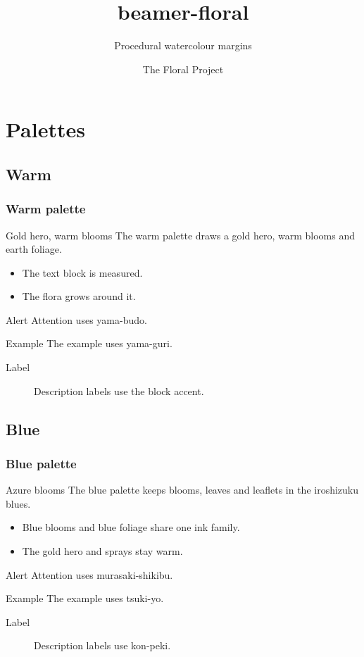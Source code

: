 \documentclass[aspectratio=169]{beamer}
\title{beamer-floral}
\subtitle{Procedural watercolour margins}
\author{The Floral Project}
\institute{beamer-floral}
\date{}
\begin{document}
\begin{frame}[plain]
  \titlepage
\end{frame}

\section{Palettes}
\subsection{Warm}

\begin{frame}
  \frametitle{Warm palette}
  \begin{block}{Gold hero, warm blooms}
    The warm palette draws a gold hero, warm blooms and earth foliage.
  \end{block}
  \begin{itemize}
    \item The text block is measured.
    \item The flora grows around it.
  \end{itemize}
  \begin{alertblock}{Alert}
    \alert{Attention} uses yama-budo.
  \end{alertblock}
  \begin{exampleblock}{Example}
    The example uses yama-guri.
  \end{exampleblock}
  \begin{description}
    \item[Label] Description labels use the block accent.
  \end{description}
\end{frame}

\subsection{Blue}

\begin{frame}
  \frametitle{Blue palette}
  \begin{block}{Azure blooms}
    The blue palette keeps blooms, leaves and leaflets in the iroshizuku blues.
  \end{block}
  \begin{itemize}
    \item Blue blooms and blue foliage share one ink family.
    \item The gold hero and sprays stay warm.
  \end{itemize}
  \begin{alertblock}{Alert}
    \alert{Attention} uses murasaki-shikibu.
  \end{alertblock}
  \begin{exampleblock}{Example}
    The example uses tsuki-yo.
  \end{exampleblock}
  \begin{description}
    \item[Label] Description labels use kon-peki.
  \end{description}
\end{frame}
\end{document}
